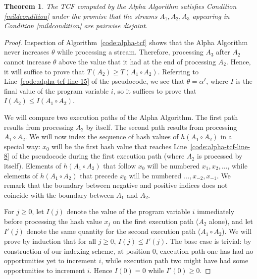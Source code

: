\documentclass{article}
\newtheorem{theorem}{Theorem}[section]
\begin{document}
\begin{theorem}
The TCF computed by the Alpha Algorithm satisfies Condition \ref{mildcondition} under the promise that the streams $A_1, A_2, A_3$ appearing
in Condition \ref{mildcondition} are pairwise disjoint.
\end{theorem}
\begin{proof}
Inspection of Algorithm~\ref{code:alpha-tcf} shows that the Alpha Algorithm never increases $\theta$ while processing a stream.
Therefore, processing $A_3$ after $A_2$ cannot increase $\theta$ above the value that it had at the end of processing
$A_2$. Hence, it will suffice to prove that $T(A_2) \ge T(A_1 \circ A_2)$. Referring to Line~\ref{code:alpha-tcf-line-15} of the pseudocode, we see
that $\theta = \alpha^I$, where $I$ is the final value of the program variable $i$, so it suffices to
prove that $I(A_2) \le I(A_1 \circ A_2)$. 

We will compare two execution paths of the Alpha Algorithm. The first path results from processing
$A_2$ by itself. The second path results from processing $A_1 \circ A_2$. We will now
index the sequence of hash values of $h(A_1 \circ A_2)$ in a special way: $x_0$ will be the
first hash value that reaches Line~\ref{code:alpha-tcf-line-8} of the pseudocode during the first execution path (where $A_2$ is
processed by itself). Elements of $h(A_1 \circ A_2)$ that follow $x_0$ will be numbered $x_1, x_2, \ldots$, while elements
of $h(A_1 \circ A_2)$ that precede $x_0$ will be numbered $\dots, x_{-2}, x_{-1}$. We remark that
the boundary between negative and positive indices does not coincide with the boundary between $A_1$ and $A_2$.

For $j \ge 0$, let
$I(j)$ denote the value of the program variable $i$ immediately before processing the hash value
$x_j$ on the first execution path ($A_2$ alone), and let $I'(j)$ denote the same quantity for the second
execution path ($A_1 \circ A_2$). We will prove by induction that for all $j \geq 0$, $I(j) \le I'(j)$.
The base case is trivial: by construction of our indexing scheme, at position $0$, execution
path one has had no opportunities yet to increment $i$, while execution path two might have had some opportunities to increment $i$.
Hence $I(0) = 0$ while $I'(0) \ge 0$. 


\end{proof}
\end{document}
